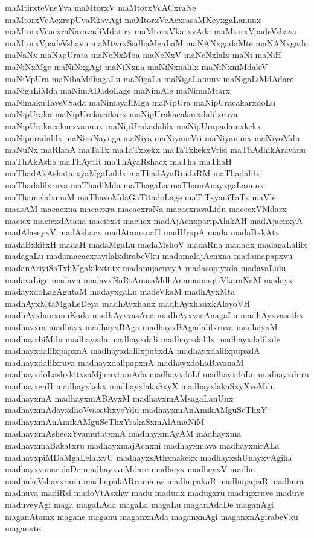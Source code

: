 {maMtirxteVneYva
maMtorxV
maMtorxVcACxraNe
maMtorxVcAcxrapUvaRkavAgi
maMtorxVcAcxrasaMKeyxgaLanunx
maMtorxVcacxraNaravadiMdatirx
maMtorxVkatxvAda
maMtorxVpadeVshava
maMtorxVpadeVshavu
maMtwrxSadhaMgaLaM
maNANxgadaMte
maNANxgadu
maNaNx
maNapUrata
maNeNxMba
maNeNxV
maNeNxlalx
maNi
maNiH
maNiNxMge
maNiNxgAgi
maNiNxna
maNiNxnalilx
maNiNxniMdaleV
maNiVpUra
maNibaMdhagaLu
maNigaLa
maNigaLanunx
maNigaLiMdAdare
maNigaLiMda
maNimADadoLage
maNimAle
maNimaMtarx
maNimakuTaveVSada
maNimayaliMga
maNipUra
maNipUracakarxdoLu
maNipUraka
maNipUrakacakarx
maNipUrakacakarxdalilxruva
maNipUrakacakarxvanunx
maNipUrakadalilx
maNipUrapadamxkekx
maNipuradalilx
maNiraNayuga
maNiya
maNiyaneVri
maNiyanunx
maNiyoMdu
maNuNx
maRlanA
maTaTx
maTaTxkekx
maTaTxkekxVrisi
maThAdhikAravanu
maThAkAsha
maThAyaR
maThAyaRshacx
maTha
maThaH
maThadAkAshatarxyaMgaLalilx
maThadAyaRnidaRM
maThadalilx
maThadalilxruva
maThadiMda
maThagaLa
maThamAnayxgaLanunx
maThamelalxmuM
maThavoMdaGaTitadoLage
maTiTxyaniTaTx
maVle
maasAM
macacxna
macacxra
macacxraNa
macacxravaLidu
macecxVMdarx
macicx
macicxdAtana
macicxsi
macucx
madAjAcnxparipAlakAH
madAjacnxyA
madAlaseyxV
madAshacx
madAtamxnaH
madUrxpA
mada
madaBxkAtx
madaBxkitxH
madaH
madaMgaLu
madaMshoV
madaRna
madadx
madagaLalilx
madagaLu
madamacacxravilalxdirabeVku
madamalajAcnxna
madamapapxvu
madanAriyiSaTxliMgakikxtutx
madanujacnxyA
madasopiyxda
madavaLidu
madavaLige
madavu
madavxNaRtAnusaMdhAnamamaqtiVkaraNaM
madayx
madayxdoLagAgutaM
madayxgaLu
madeVkaM
madhAyxMta
madhAyxMtaMgaLeDeya
madhAyxhanx
madhAyxhanxkAlayoVH
madhAyxhanxmuKada
madhAyxvasAna
madhAyxvasAnagaLu
madhAyxvasethx
madhavxra
madhayx
madhayxBAga
madhayxBAgadalilxruva
madhayxM
madhayxbiMdu
madhayxda
madhayxdali
madhayxdalilx
madhayxdalilxde
madhayxdalilxpapxnA
madhayxdalilxpubxdA
madhayxdalilxpupxdA
madhayxdalilxruva
madhayxdalipapxnA
madhayxdoLaBavanaM
madhayxdoLashxkitxsaMjicnxtamAda
madhayxdoLf
madhayxdoLu
madhayxduru
madhayxgaH
madhayxkekx
madhayxlakaSxyX
madhayxlakaSxyXveMdu
madhayxmA
madhayxmABAyxM
madhayxmAMsagaLanUnx
madhayxmAdayxdhoVvasethxyeYdu
madhayxmAnAmikAMguSeThxY
madhayxmAnAmikAMguSeThxYrakaSxmAlAmaNiM
madhayxmAshecxYvamutatxmA
madhayxmAyAM
madhayxma
madhayxmaBakatxru
madhayxmajAcnxni
madhayxmava
madhayxnirALa
madhayxpiMDaMgaLelalxvU
madhayxsAthxnakekx
madhayxshUnayxvAgiha
madhayxvanaridaDe
madhayxveMdare
madheyx
madheyxV
madhu
madhukeVshavxranu
madhupakARcamanw
madhupakaR
madhupapaR
madhura
madhuva
madiRsi
madoVtAsxhw
madu
madudx
madugxru
madugxruve
maduve
maduveyAgi
maga
magaLAda
magaLa
magaLu
maganAdaDe
maganAgi
maganAtamx
magane
maganu
maganxnAda
maganxnAgi
maganxnAgirabeVku
maganxte
}

